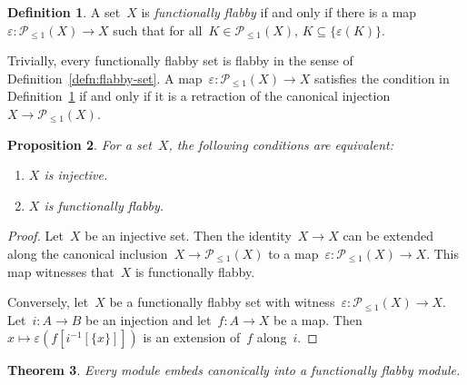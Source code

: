 \documentclass[oneside]{amsart}
\theoremstyle{definition}
\newtheorem{defn}{Definition}[section]
\theoremstyle{plain}
\newtheorem{prop}[defn]{Proposition}
\newtheorem{thm}[defn]{Theorem}
\theoremstyle{remark}
\renewcommand{\P}{\mathcal{P}}
\renewcommand{\_}{\mathpunct{.}\,}
\begin{document}
\begin{defn}\label{defn:functionally-flabby}
A set~$X$ is \emph{functionally flabby} if and only if there is a
map~$\varepsilon : \P_{\leq1}(X) \to X$ such that for all~$K \in
\P_{\leq1}(X)$, $K \subseteq \{ \varepsilon(K) \}$.\end{defn}

Trivially, every functionally flabby set is flabby in the sense of
Definition~\ref{defn:flabby-set}.
A map~$\varepsilon : \P_{\leq1}(X) \to X$ satisfies the condition in
Definition~\ref{defn:functionally-flabby} if and only if it is a retraction of
the canonical injection~$X \to \P_{\leq1}(X)$.

\begin{prop}For a set~$X$, the following conditions are equivalent:
\begin{enumerate}
\item $X$ is injective.
\item $X$ is functionally flabby.
\end{enumerate}
\end{prop}

\begin{proof}Let~$X$ be an injective set. Then the identity~$X \to X$ can be extended
along the canonical inclusion~$X \to \P_{\leq1}(X)$ to a map~$\varepsilon :
\P_{\leq1}(X) \to X$. This map witnesses that~$X$ is functionally flabby.

Conversely, let~$X$ be a functionally flabby set with witness~$\varepsilon :
\P_{\leq1}(X) \to X$. Let~$i : A \to B$ be an injection and let~$f : A \to X$
be a map. Then~$x \mapsto \varepsilon(f[i^{-1}[\{x\}]])$ is an extension of~$f$
along~$i$.
\end{proof}

\begin{thm}\label{thm:enough-flabby-modules}
Every module embeds canonically into a functionally flabby module.\end{thm}
\end{document}
